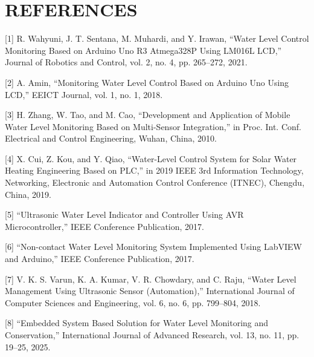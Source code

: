\documentclass[12pt,a4paper]{article}
\begin{document}
\section{REFERENCES}

[1] R. Wahyuni, J. T. Sentana, M. Muhardi, and Y. Irawan, ``Water Level Control Monitoring Based on Arduino Uno R3 Atmega328P Using LM016L LCD,'' Journal of Robotics and Control, vol. 2, no. 4, pp. 265--272, 2021.

[2] A. Amin, ``Monitoring Water Level Control Based on Arduino Uno Using LCD,'' EEICT Journal, vol. 1, no. 1, 2018.

[3] H. Zhang, W. Tao, and M. Cao, ``Development and Application of Mobile Water Level Monitoring Based on Multi-Sensor Integration,'' in Proc. Int. Conf. Electrical and Control Engineering, Wuhan, China, 2010.

[4] X. Cui, Z. Kou, and Y. Qiao, ``Water-Level Control System for Solar Water Heating Engineering Based on PLC,'' in 2019 IEEE 3rd Information Technology, Networking, Electronic and Automation Control Conference (ITNEC), Chengdu, China, 2019.

[5] ``Ultrasonic Water Level Indicator and Controller Using AVR Microcontroller,'' IEEE Conference Publication, 2017.

[6] ``Non-contact Water Level Monitoring System Implemented Using LabVIEW and Arduino,'' IEEE Conference Publication, 2017.

[7] V. K. S. Varun, K. A. Kumar, V. R. Chowdary, and C. Raju, ``Water Level Management Using Ultrasonic Sensor (Automation),'' International Journal of Computer Sciences and Engineering, vol. 6, no. 6, pp. 799--804, 2018.

[8] ``Embedded System Based Solution for Water Level Monitoring and Conservation,'' International Journal of Advanced Research, vol. 13, no. 11, pp. 19--25, 2025.
\end{document}
